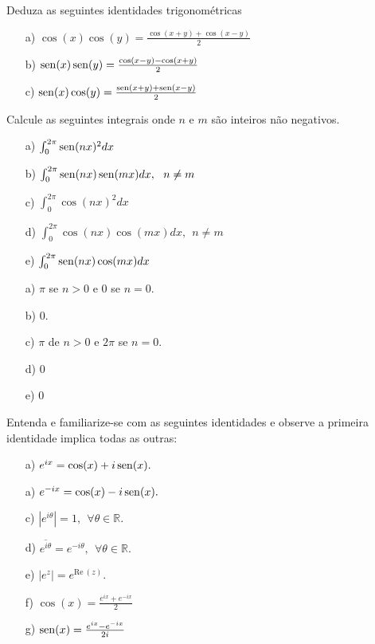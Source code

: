 \begin{Exercise} Deduza as seguintes identidades trigonométricas
\begin{itemize}
\item[a)] $\cos(x) \cos(y) = \frac {\cos(x+y) + \cos(x-y)}{2}$
\item[b)] $\operatorname{sen}(x) \operatorname{sen}(y) = \frac {\cos(x-y) - \cos(x+y)}{2}$
\item[c)] $\operatorname{sen}(x) \cos(y) = \frac {\operatorname{sen}(x+y) + \operatorname{sen}(x-y)}{2}$
\end{itemize}
\end{Exercise}

\begin{Exercise}Calcule as seguintes integrais onde $n$ e $m$ são inteiros não negativos.
\begin{itemize}
\item [a)] $\int_0^{2\pi}\operatorname{sen}(nx)^2dx$
\item [b)] $\int_0^{2\pi}\operatorname{sen}(nx)\operatorname{sen}(mx)dx,~~n\neq m$
\item [c)] $\int_0^{2\pi}\cos(nx)^2dx$
\item [d)] $\int_0^{2\pi}\cos(nx)\cos(mx)dx,~~n\neq m$
\item [e)] $\int_0^{2\pi}\operatorname{sen}(nx)\cos(mx)dx$
\end{itemize}
\end{Exercise}
\begin{Answer}
\begin{itemize}
\item [a)] $\pi$ se $n>0$ e $0$ se $n=0$.
\item [b)] $0$.
\item [c)] $\pi$ de $n>0$ e $2\pi$ se $n=0$.
\item [d)] $0$
\item [e)] $0$
\end{itemize}
\end{Answer}

\begin{Exercise}\label{familiarize} Entenda e familiarize-se com as seguintes identidades e observe a primeira identidade implica todas as outras:
\begin{itemize}
 \item [a)] $e^{ix}=\cos(x)+i\operatorname{sen}(x).$
 \item [a)] $e^{-ix}=\cos(x)-i\operatorname{sen}(x).$
 \item [c)] $|e^{i\theta}|=1, ~~ \forall \theta\in\mathbb{R}.$
 \item [d)] $\overline{e^{i\theta}}=e^{-i\theta}, ~~ \forall \theta\in\mathbb{R}.$
 \item [e)] $|e^{z}|=e^{\text{Re}~\!( z)}.$
 \item [f)] $\cos(x)=\frac{e^{ix}+e^{-ix}}{2}$
 \item [g)] $\operatorname{sen}(x)=\frac{e^{ix}-e^{-ix}}{2i}$
 \end{itemize}

\end{Exercise}

